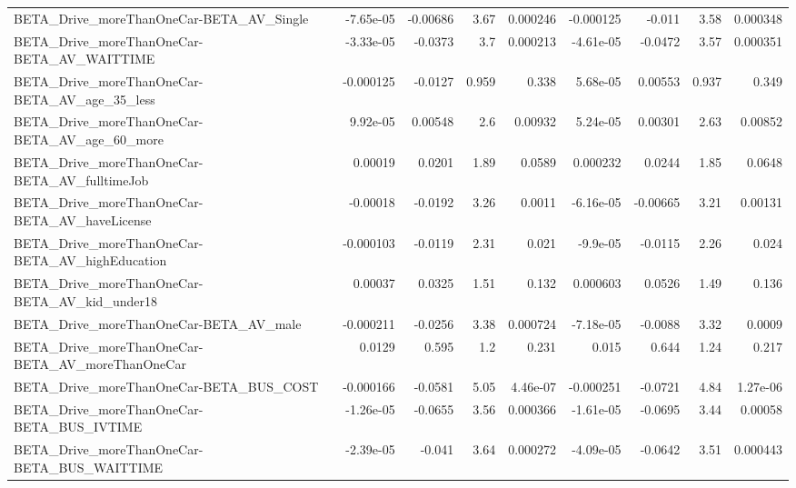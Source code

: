 \begin{tabular}{lrrrrrrrr}
BETA\_Drive\_moreThanOneCar-BETA\_AV\_Single           &   -7.65e-05 &     -0.00686 &      3.67 & 0.000246 &  -0.000125 &      -0.011 &         3.58 &      0.000348 \\
BETA\_Drive\_moreThanOneCar-BETA\_AV\_WAITTIME         &   -3.33e-05 &      -0.0373 &       3.7 & 0.000213 &  -4.61e-05 &     -0.0472 &         3.57 &      0.000351 \\
BETA\_Drive\_moreThanOneCar-BETA\_AV\_age\_35\_less      &   -0.000125 &      -0.0127 &     0.959 &    0.338 &   5.68e-05 &     0.00553 &        0.937 &         0.349 \\
BETA\_Drive\_moreThanOneCar-BETA\_AV\_age\_60\_more      &    9.92e-05 &      0.00548 &       2.6 &  0.00932 &   5.24e-05 &     0.00301 &         2.63 &       0.00852 \\
BETA\_Drive\_moreThanOneCar-BETA\_AV\_fulltimeJob      &     0.00019 &       0.0201 &      1.89 &   0.0589 &   0.000232 &      0.0244 &         1.85 &        0.0648 \\
BETA\_Drive\_moreThanOneCar-BETA\_AV\_haveLicense      &    -0.00018 &      -0.0192 &      3.26 &   0.0011 &  -6.16e-05 &    -0.00665 &         3.21 &       0.00131 \\
BETA\_Drive\_moreThanOneCar-BETA\_AV\_highEducation    &   -0.000103 &      -0.0119 &      2.31 &    0.021 &   -9.9e-05 &     -0.0115 &         2.26 &         0.024 \\
BETA\_Drive\_moreThanOneCar-BETA\_AV\_kid\_under18      &     0.00037 &       0.0325 &      1.51 &    0.132 &   0.000603 &      0.0526 &         1.49 &         0.136 \\
BETA\_Drive\_moreThanOneCar-BETA\_AV\_male             &   -0.000211 &      -0.0256 &      3.38 & 0.000724 &  -7.18e-05 &     -0.0088 &         3.32 &        0.0009 \\
BETA\_Drive\_moreThanOneCar-BETA\_AV\_moreThanOneCar   &      0.0129 &        0.595 &       1.2 &    0.231 &      0.015 &       0.644 &         1.24 &         0.217 \\
BETA\_Drive\_moreThanOneCar-BETA\_BUS\_COST            &   -0.000166 &      -0.0581 &      5.05 & 4.46e-07 &  -0.000251 &     -0.0721 &         4.84 &      1.27e-06 \\
BETA\_Drive\_moreThanOneCar-BETA\_BUS\_IVTIME          &   -1.26e-05 &      -0.0655 &      3.56 & 0.000366 &  -1.61e-05 &     -0.0695 &         3.44 &       0.00058 \\
BETA\_Drive\_moreThanOneCar-BETA\_BUS\_WAITTIME        &   -2.39e-05 &       -0.041 &      3.64 & 0.000272 &  -4.09e-05 &     -0.0642 &         3.51 &      0.000443 \\

\end{tabular}
